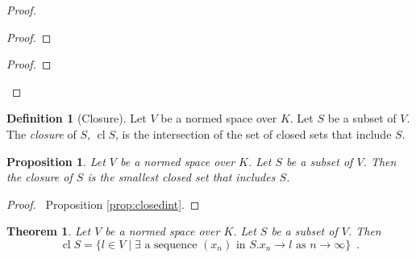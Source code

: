 \documentclass{book}
\let\qed\relax
\newtheorem{prop}[ax]{Proposition}
\newtheorem{thm}[ax]{Theorem}
\theoremstyle{definition}
\newtheorem{df}[ax]{Definition}
\newcommand{\cl}{\ensuremath{\operatorname{cl}}}
\begin{document}
\begin{proof}
\pf
{}
\begin{proof}
\end{proof}
\begin{proof}
\end{proof}
\qed
\end{proof}

\begin{df}[Closure]
Let $V$ be a normed space over $K$. Let $S$ be a subset of $V$. The \emph{closure} of $S$, $\cl S$, is the intersection of the set of closed sets that include $S$.
\end{df}

\begin{prop}
Let $V$ be a normed space over $K$. Let $S$ be a subset of $V$. Then the closure of $S$ is the smallest closed set that includes $S$.
\end{prop}

\begin{proof}
\pf\ Proposition \ref{prop:closedint}. \qed
\end{proof}

\begin{thm}
\label{thm:closureconverge}
Let $V$ be a normed space over $K$. Let $S$ be a subset of $V$. Then
\[ \cl S = \{l \in V \mid \exists \text{ a sequence } (x_n) \text{ in } S. x_n \rightarrow l \text{ as } n \rightarrow \infty \} \enspace . \]
\end{thm}
\end{document}
